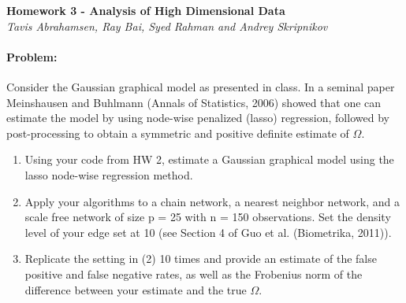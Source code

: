 \documentclass[12pt, leqno]{article}
\begin{document}
\pagestyle{fancy}

\begin{center}
{\large {\bf Homework 3 - Analysis of High Dimensional Data}} \\
{\it{Tavis Abrahamsen, Ray Bai, Syed Rahman and Andrey Skripnikov}} \\
\end{center}

\paragraph{Problem:} Consider the Gaussian graphical model as presented in
class. In a seminal paper Meinshausen and Buhlmann (Annals of
Statistics, 2006) showed that one can estimate the model by using
node-wise penalized (lasso) regression, followed by post-processing to
obtain a symmetric and positive definite estimate of $\Omega$.
\begin{enumerate}
\item Using your code from HW 2, estimate a Gaussian graphical model using the lasso node-wise regression method.
\item Apply your algorithms to a chain network, a nearest neighbor network, and a scale free network of size p = 25 with n = 150 observations. Set the density level of your edge set at 10 (see Section 4 of Guo et al. (Biometrika, 2011)).
\item Replicate the setting in (2) 10 times and provide an estimate of the
false positive and false negative rates, as well as the Frobenius norm
of the difference between your estimate and the true $\Omega$.
\end{enumerate}
\end{document}
